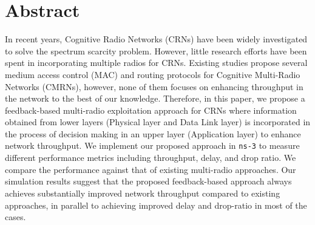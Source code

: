 \chapter*{Abstract}
 In recent years, Cognitive Radio Networks (CRNs) have been widely investigated to solve the spectrum scarcity problem. However, little research efforts have been spent in incorporating multiple radios for CRNs. Existing studies propose several medium access control (MAC) and routing protocols for Cognitive Multi-Radio Networks (CMRNs), however, none of them focuses on enhancing throughput in the network to the best of our knowledge. Therefore, in this paper, we propose a feedback-based multi-radio exploitation approach for CRNs where information obtained from lower layers (Physical layer and Data Link layer) is incorporated in the process of decision making in an upper layer (Application layer) to enhance network throughput. We implement our proposed approach in \texttt{ns-3} to measure different performance metrics including throughput, delay, and drop ratio. We compare the performance against that of existing multi-radio approaches. Our simulation results suggest that the proposed feedback-based approach always achieves substantially improved network throughput compared to existing approaches, in parallel to achieving improved delay and drop-ratio in most of the cases.
